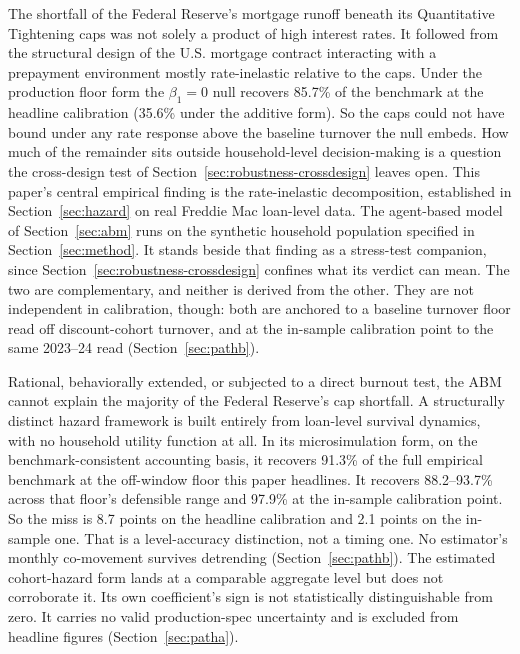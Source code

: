 \documentclass[12pt]{article}
\begin{document}
The shortfall of the Federal Reserve's mortgage runoff beneath its Quantitative Tightening caps was not solely a product of high interest rates. It followed from the structural design of the U.S. mortgage contract interacting with a prepayment environment mostly rate-inelastic relative to the caps. Under the production floor form the $\beta_1 = 0$ null recovers 85.7\% of the benchmark at the headline calibration (35.6\% under the additive form). So the caps could not have bound under any rate response above the baseline turnover the null embeds. How much of the remainder sits outside household-level decision-making is a question the cross-design test of Section~\ref{sec:robustness-crossdesign} leaves open. This paper's central empirical finding is the rate-inelastic decomposition, established in Section~\ref{sec:hazard} on real Freddie Mac loan-level data. The agent-based model of Section~\ref{sec:abm} runs on the synthetic household population specified in Section~\ref{sec:method}. It stands beside that finding as a stress-test companion, since Section~\ref{sec:robustness-crossdesign} confines what its verdict can mean. The two are complementary, and neither is derived from the other. They are not independent in calibration, though: both are anchored to a baseline turnover floor read off discount-cohort turnover, and at the in-sample calibration point to the same 2023--24 read (Section~\ref{sec:pathb}).

Rational, behaviorally extended, or subjected to a direct burnout test, the ABM cannot explain the majority of the Federal Reserve's cap shortfall. A structurally distinct hazard framework is built entirely from loan-level survival dynamics, with no household utility function at all. In its microsimulation form, on the benchmark-consistent accounting basis, it recovers 91.3\% of the full empirical benchmark at the off-window floor this paper headlines. It recovers 88.2--93.7\% across that floor's defensible range and 97.9\% at the in-sample calibration point. So the miss is 8.7 points on the headline calibration and 2.1 points on the in-sample one. That is a level-accuracy distinction, not a timing one. No estimator's monthly co-movement survives detrending (Section~\ref{sec:pathb}). The estimated cohort-hazard form lands at a comparable aggregate level but does not corroborate it. Its own coefficient's sign is not statistically distinguishable from zero. It carries no valid production-spec uncertainty and is excluded from headline figures (Section~\ref{sec:patha}).
\end{document}
